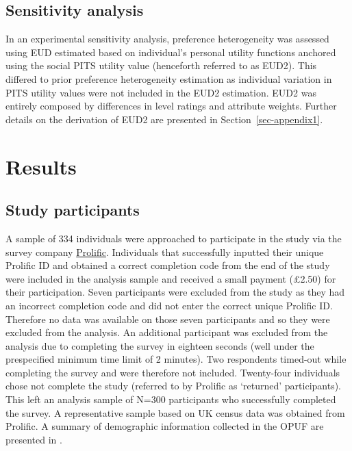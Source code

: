 \documentclass[
  number,
  preprint]{elsarticle}
\begin{document}
\subsection{Sensitivity analysis}\label{sensitivity-analysis}

In an experimental sensitivity analysis, preference heterogeneity was
assessed using EUD estimated based on individual's personal utility
functions anchored using the social PITS utility value (henceforth
referred to as EUD2). This differed to prior preference heterogeneity
estimation as individual variation in PITS utility values were not
included in the EUD2 estimation. EUD2 was entirely composed by
differences in level ratings and attribute weights. Further details on
the derivation of EUD2 are presented in Section~\ref{sec-appendix1}.

\section{Results}\label{results}

\subsection{Study participants}\label{study-participants}

A sample of 334 individuals were approached to participate in the study
via the survey company \href{https://www.prolific.com}{Prolific}.
Individuals that successfully inputted their unique Prolific ID and
obtained a correct completion code from the end of the study were
included in the analysis sample and received a small payment (£2.50) for
their participation. Seven participants were excluded from the study as
they had an incorrect completion code and did not enter the correct
unique Prolific ID. Therefore no data was available on those seven
participants and so they were excluded from the analysis. An additional
participant was excluded from the analysis due to completing the survey
in eighteen seconds (well under the prespecified minimum time limit of 2
minutes). Two respondents timed-out while completing the survey and were
therefore not included. Twenty-four individuals chose not complete the
study (referred to by Prolific as `returned' participants). This left an
analysis sample of N=300 participants who successfully completed the
survey. A representative sample based on UK census data was obtained
from Prolific. A summary of demographic information collected in the
OPUF are presented in \citep{tab-demographic}.
\end{document}
